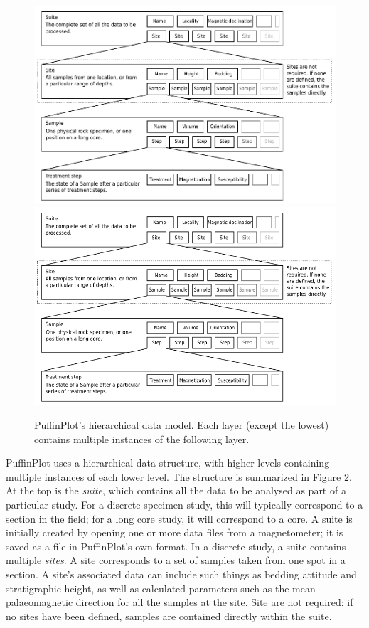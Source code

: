 \documentclass[a4paper,british]{article}
\begin{document}
\begin{figure}[htbp]
\centering
\ifpdf\includegraphics{figures/data-model.pdf}
\else\includegraphics{figures/data-model.png}
\fi
\caption{PuffinPlot's hierarchical data model. Each layer (except the
lowest) contains multiple instances of the following layer.}
\end{figure}

PuffinPlot uses a hierarchical data structure, with higher levels containing
multiple instances of each lower level. The structure is summarized in Figure
2. At the top is the \emph{suite}, which contains all the data to be analysed
as part of a particular study. For a discrete specimen study, this will
typically correspond to a section in the field; for a long core study, it
will correspond to a core. A suite is initially created by opening one or
more data files from a magnetometer; it is saved as a file in PuffinPlot's
own format. In a discrete study, a suite contains multiple \emph{sites}. A
site corresponds to a set of samples taken from one spot in a section. A
site's associated data can include such things as bedding attitude and
stratigraphic height, as well as calculated parameters such as the mean
palaeomagnetic direction for all the samples at the site. Site are not
required: if no sites have been defined, samples are contained directly
within the suite.
\end{document}
